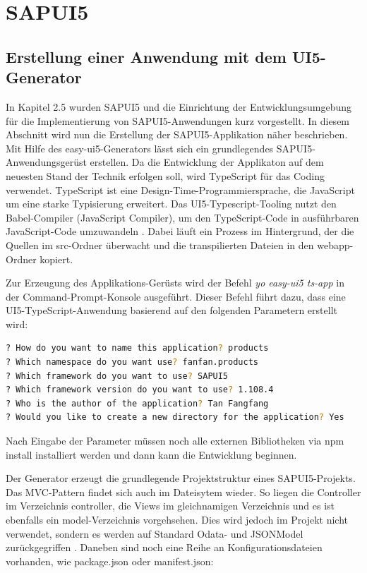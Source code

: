 \section{SAPUI5}
\subsection{Erstellung einer Anwendung mit dem UI5-Generator}
In Kapitel 2.5 wurden SAPUI5 und die Einrichtung der Entwicklungsumgebung für die Implementierung von SAPUI5-Anwendungen kurz vorgestellt. In diesem Abschnitt wird nun die Erstellung der SAPUI5-Applikation näher beschrieben.
Mit Hilfe des easy-ui5-Generators lässt sich ein grundlegendes SAPUI5-Anwendungsgerüst erstellen. Da die Entwicklung der Applikaton auf dem neuesten Stand der Technik erfolgen soll, wird TypeScript für das Coding verwendet. TypeScript ist eine Design-Time-Programmiersprache, die JavaScript um eine starke Typisierung erweitert. Das UI5-Typescript-Tooling nutzt den Babel-Compiler (JavaScript Compiler), um den TypeScript-Code in ausführbaren JavaScript-Code umzuwandeln \cite{pm:gswt}. Dabei läuft ein Prozess im Hintergrund, der die Quellen im src-Ordner überwacht und die transpilierten Dateien in den webapp-Ordner kopiert. 

Zur Erzeugung des Applikations-Gerüsts wird der Befehl \textit{yo easy-ui5 ts-app} in der Command-Prompt-Konsole ausgeführt. Dieser Befehl führt dazu, dass eine UI5-TypeScript-Anwendung basierend auf den folgenden Parametern erstellt wird:

\begin{lstlisting}[language=bash, caption=Eingabe der Paramtern des UI5-Generators]
? How do you want to name this application? products
? Which namespace do you want use? fanfan.products 
? Which framework do you want to use? SAPUI5 
? Which framework version do you want to use? 1.108.4 
? Who is the author of the application? Tan Fangfang 
? Would you like to create a new directory for the application? Yes
\end{lstlisting}

Nach Eingabe der Parameter müssen noch alle externen Bibliotheken via npm install installiert werden und dann kann die Entwicklung beginnen.

Der Generator erzeugt die grundlegende Projektstruktur eines SAPUI5-Projekts. Das MVC-Pattern findet sich auch im Dateisytem wieder. So liegen die Controller im Verzeichnis controller, die Views im gleichnamigen Verzeichnis und es ist ebenfalls ein model-Verzeichnis vorgehsehen. Dies wird jedoch im Projekt nicht verwendet, sondern es werden auf Standard Odata- und JSONModel zurückgegriffen \cite{sud:ao}. Daneben sind noch eine Reihe an Konfigurationsdateien vorhanden, wie package.json oder manifest.json: 

